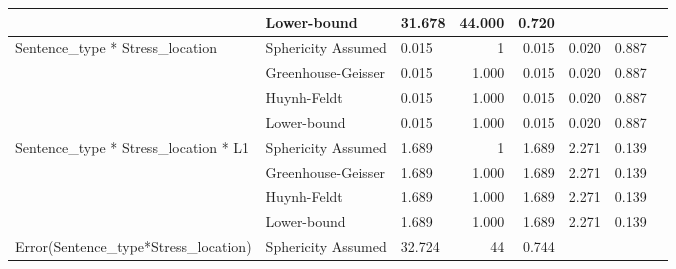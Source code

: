 \documentclass[a4paper]{article}
\begin{document}
\begin{table}[H]
\begin{center}
\begin{tabular}{p{}p{}|l|r|r|r|r|r|}
\cline{2-7}
                                                        & Lower-bound        & 31.678                            & 44.000                  & 0.720                            & \multicolumn{1}{l|}{~} & \multicolumn{1}{l|}{~}     \\ 
\hline
\multirow{4}{*}{Sentence\_type * Stress\_location}      & Sphericity Assumed & 0.015                             & 1                       & 0.015                            & 0.020                  & 0.887                      \\ 
\cline{2-7}
                                                        & Greenhouse-Geisser & 0.015                             & 1.000                   & 0.015                            & 0.020                  & 0.887                      \\ 
\cline{2-7}
                                                        & Huynh-Feldt        & 0.015                             & 1.000                   & 0.015                            & 0.020                  & 0.887                      \\ 
\cline{2-7}
                                                        & Lower-bound        & 0.015                             & 1.000                   & 0.015                            & 0.020                  & 0.887                      \\ 
\hline
\multirow{4}{*}{Sentence\_type * Stress\_location * L1} & Sphericity Assumed & 1.689                             & 1                       & 1.689                            & 2.271                  & 0.139                      \\ 
\cline{2-7}
                                                        & Greenhouse-Geisser & 1.689                             & 1.000                   & 1.689                            & 2.271                  & 0.139                      \\ 
\cline{2-7}
                                                        & Huynh-Feldt        & 1.689                             & 1.000                   & 1.689                            & 2.271                  & 0.139                      \\ 
\cline{2-7}
                                                        & Lower-bound        & 1.689                             & 1.000                   & 1.689                            & 2.271                  & 0.139                      \\ 
\hline
\multirow{4}{*}{Error(Sentence\_type*Stress\_location)} & Sphericity Assumed & 32.724                            & 44                      & 0.744                            & \multicolumn{1}{l|}{~} & \multicolumn{1}{l|}{~}     \\ 

\end{tabular}
\end{center}
\end{table}
\end{document}
